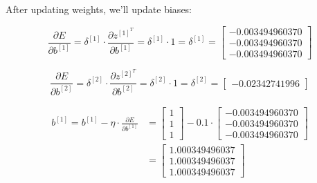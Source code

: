 \documentclass[12pt]{article}
\begin{document}
\begin{enumerate}[leftmargin=\labelsep]
          After updating weights, we'll update biases:
          
          \begin{equation*}
            \frac{\partial E}{\partial b^{[1]}} = \delta^{[1]} \cdot
            \frac{\partial z^{[1]^T}}{\partial b^{[1]}}
            = \delta^{[1]} \cdot 1
            = \delta^{[1]}
            = \begin{bmatrix}
                - 0.003494960370 \\
                - 0.003494960370 \\
                - 0.003494960370
              \end{bmatrix}
          \end{equation*}

          \begin{equation*}
            \frac{\partial E}{\partial b^{[2]}} = \delta^{[2]} \cdot
            \frac{\partial z^{[2]^T}}{\partial b^{[2]}}
            = \delta^{[2]} \cdot 1
            = \delta^{[2]}
            = \begin{bmatrix}
                - 0.02342741996
              \end{bmatrix}
          \end{equation*}

          \begin{equation*}
            \begin{aligned}
              b^{[1]} = b^{[1]} - \eta \cdot \frac{\partial E}{\partial b^{[1]}}
              &= \begin{bmatrix}
                  1 \\
                  1 \\
                  1
                \end{bmatrix} - 0.1 \cdot \begin{bmatrix}
                  - 0.003494960370 \\
                  - 0.003494960370 \\
                  - 0.003494960370
                \end{bmatrix} \\
              &= \begin{bmatrix}
                1.000349496037 \\
                1.000349496037 \\
                1.000349496037
                \end{bmatrix}
            \end{aligned}
          \end{equation*}


\end{enumerate}
\end{document}
